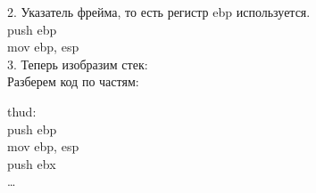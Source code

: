 \documentclass[12pt, letterpaper]{article}
\begin{document}
2. Указатель фрейма, то есть регистр ebp используется.\\
push ebp\\
mov ebp, esp\\

3. Теперь изобразим стек:\\

Разберем код по частям:\\
\begin{minipage}{.4\textwidth}
    \noindent thud:\\
        push   ebp\\
        mov    ebp, esp\\
        push   ebx\\
    \dots\\
\end{minipage}  
\begin{minipage}{.4\textwidth}
\end{minipage} 
\end{document}
